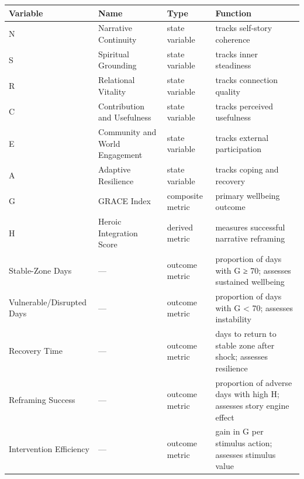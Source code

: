 \documentclass[
  journal,
]{IEEEtran}%
\newcounter{none} %
\begin{document}
{\def\LTcaptype{none} %
\begin{longtable}[]{@{}
  >{\raggedright\arraybackslash}p{}
  >{\raggedright\arraybackslash}p{}
  >{\raggedright\arraybackslash}p{}
  >{\raggedright\arraybackslash}p{}@{}}
\toprule\noalign{}
\begin{minipage}[b]{\linewidth}\raggedright
Variable
\end{minipage} & \begin{minipage}[b]{\linewidth}\raggedright
Name
\end{minipage} & \begin{minipage}[b]{\linewidth}\raggedright
Type
\end{minipage} & \begin{minipage}[b]{\linewidth}\raggedright
Function
\end{minipage} \\
\midrule\noalign{}
\endhead
\bottomrule\noalign{}
\endlastfoot
N & Narrative Continuity & state variable & tracks self-story
coherence \\
S & Spiritual Grounding & state variable & tracks inner steadiness \\
R & Relational Vitality & state variable & tracks connection quality \\
C & Contribution and Usefulness & state variable & tracks perceived
usefulness \\
E & Community and World Engagement & state variable & tracks external
participation \\
A & Adaptive Resilience & state variable & tracks coping and recovery \\
G & GRACE Index & composite metric & primary wellbeing outcome \\
H & Heroic Integration Score & derived metric & measures successful
narrative reframing \\
Stable-Zone Days & --- & outcome metric & proportion of days with G ≥
70; assesses sustained wellbeing \\
Vulnerable/Disrupted Days & --- & outcome metric & proportion of days
with G \textless{} 70; assesses instability \\
Recovery Time & --- & outcome metric & days to return to stable zone
after shock; assesses resilience \\
Reframing Success & --- & outcome metric & proportion of adverse days
with high H; assesses story engine effect \\
Intervention Efficiency & --- & outcome metric & gain in G per stimulus
action; assesses stimulus value \\
\end{longtable}
}
\end{document}
